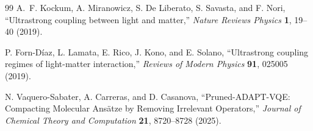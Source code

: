 \documentclass[
  reprint,
  amsmath,
  amssymb,
  aps,
  pra,
  nofootinbib,
  superscriptaddress,
  floatfix
]{revtex4-2}
\begin{document}
\begin{thebibliography}{99}
A.~F. Kockum, A. Miranowicz, S. De Liberato, S. Savasta, and F. Nori,
``Ultrastrong coupling between light and matter,''
\emph{Nature Reviews Physics} \textbf{1}, 19--40 (2019).

P. Forn-D{\'i}az, L. Lamata, E. Rico, J. Kono, and E. Solano,
``Ultrastrong coupling regimes of light-matter interaction,''
\emph{Reviews of Modern Physics} \textbf{91}, 025005 (2019).

N. Vaquero-Sabater, A. Carreras, and D. Casanova,
``Pruned-ADAPT-VQE: Compacting Molecular Ans\"atze by Removing Irrelevant Operators,''
\emph{Journal of Chemical Theory and Computation} \textbf{21}, 8720--8728 (2025).

\end{thebibliography}
\end{document}
